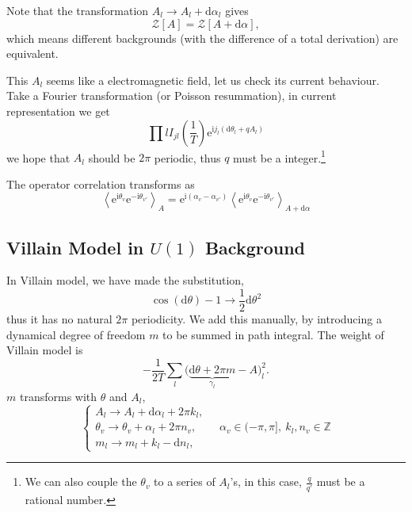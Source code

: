 Note that the transformation $A_{l} \to A_{l} + \mathrm{d} \alpha _{l}$ gives
\begin{equation}
  \mathcal{Z}[A] = \mathcal{Z}[A + \mathrm{d} \alpha],
\end{equation}
which means different backgrounds (with the difference of a total derivation) are equivalent.

This $A_l$ seems like a electromagnetic field, let us check its current behaviour. Take a Fourier transformation (or Poisson resummation), in current representation we get
\begin{equation}
  \prod{l} I_{j l} \left( \frac{1}{T} \right) \mathrm{e}^{\mathrm{i} j_{l} \left( \mathrm{d} \theta_{l} + q A_l \right)}
\end{equation}
we hope that $A_l$ should be $2 \pi $ periodic, thus $q$ must be a integer.\footnote{We can also couple the $\theta _{v}$ to a series of $A_l$'s, in this case, $\frac{q}{q'}$ must be a rational number.}

The operator correlation transforms as 
\begin{equation}
  \left< \mathrm{e}^{\mathrm{i} \theta_{v}} \mathrm{e}^{- \mathrm{i} \theta _{v'}} \right>_{A} = \mathrm{e}^{\mathrm{i} \left( \alpha _{v} - \alpha _{v'} \right) } \left< \mathrm{e}^{\mathrm{i} \theta _{v}} \mathrm{e}^{-\mathrm{i} \theta _{v'}} \right>_{A + \mathrm{d} \alpha}
\end{equation}

\subsection{Villain Model in $U(1)$ Background}
In Villain model, we have made the substitution,
\begin{equation}
  \cos (\mathrm{d} \theta) -1 \to \frac{1}{2} \mathrm{d} \theta^{2}
\end{equation}
thus it has no natural $2 \pi $ periodicity. We add this manually, by introducing a dynamical degree of freedom $m$ to be summed in path integral. The weight of Villain model is
\begin{equation}
  - \frac{1}{2T} \sum_{l} \bigl( \underbrace{\mathrm{d} \theta + 2 \pi m}_{\gamma _{l}} - A \bigr)_{l}^{2}.
\end{equation}
$m$ transforms with $\theta $ and $A_l$,
\begin{equation}
  \begin{cases}
    A_l \to A_l + \mathrm{d} \alpha _{l} + 2 \pi k_{l}, \\
    \theta_{v} \to \theta _{v} + \alpha _{l} + 2 \pi n_v, \\
    m_l \to m_l + k_l - \mathrm{d} n_l,
  \end{cases}
  \quad \alpha _{v} \in (-\pi ,\pi ],\ k_l, n_v \in \mathbb{Z}
\end{equation}


